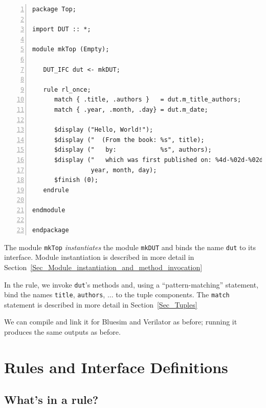 {\footnotesize
\begin{Verbatim}[frame=single, numbers=left, label=in file Ex\_04\_04/Top.bsv]
package Top;

import DUT :: *;

module mkTop (Empty);

   DUT_IFC dut <- mkDUT;

   rule rl_once;
      match { .title, .authors }   = dut.m_title_authors;
      match { .year, .month, .day} = dut.m_date;

      $display ("Hello, World!");
      $display ("  (From the book: %s", title);
      $display ("   by:            %s", authors);
      $display ("   which was first published on: %4d-%02d-%02d)",
                year, month, day);
      $finish (0);
   endrule

endmodule

endpackage
\end{Verbatim}
}

The module \verb|mkTop| \emph{instantiates} the module \verb|mkDUT|
and binds the name \verb|dut| to its interface.  Module instantiation
is described in more detail in
Section~\ref{Sec_Module_instantiation_and_method_invocation}

In the rule, we invoke \verb|dut|'s methods and, using a
``pattern-matching'' statement, bind the names \verb|title|,
\verb|authors|, ... {\etc} to the tuple components. The \verb|match|
statement is described in more detail in Section~\ref{Sec_Tuples}

We can compile and link it for Bluesim and Verilator as before;
running it produces the same outputs as before.




\section{Rules and Interface Definitions}

\label{Sec_Rules_and_Interface_Defs}


\subsection{What's in a rule?}

